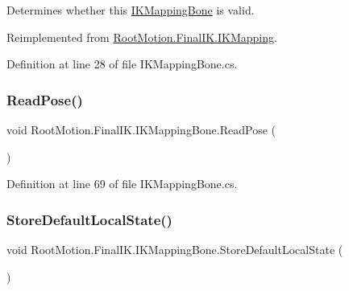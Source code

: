 Determines whether this \mbox{\hyperlink{class_root_motion_1_1_final_i_k_1_1_i_k_mapping_bone}{I\+K\+Mapping\+Bone}} is valid. 



Reimplemented from \mbox{\hyperlink{class_root_motion_1_1_final_i_k_1_1_i_k_mapping_a4a81f9083afd318e2578de48fa914870}{Root\+Motion.\+Final\+I\+K.\+I\+K\+Mapping}}.



Definition at line 28 of file I\+K\+Mapping\+Bone.\+cs.

\mbox{\label{class_root_motion_1_1_final_i_k_1_1_i_k_mapping_bone_a538b21a94c446a812a001503cc0e20be}} 
\subsubsection{\texorpdfstring{Read\+Pose()}{ReadPose()}}
{\footnotesize\ttfamily void Root\+Motion.\+Final\+I\+K.\+I\+K\+Mapping\+Bone.\+Read\+Pose (\begin{DoxyParamCaption}{ }\end{DoxyParamCaption})}



Definition at line 69 of file I\+K\+Mapping\+Bone.\+cs.

\mbox{\label{class_root_motion_1_1_final_i_k_1_1_i_k_mapping_bone_aa8ef31cdff87a68f606a2c64a29ef2ef}} 
\subsubsection{\texorpdfstring{Store\+Default\+Local\+State()}{StoreDefaultLocalState()}}
{\footnotesize\ttfamily void Root\+Motion.\+Final\+I\+K.\+I\+K\+Mapping\+Bone.\+Store\+Default\+Local\+State (\begin{DoxyParamCaption}{ }\end{DoxyParamCaption})}



